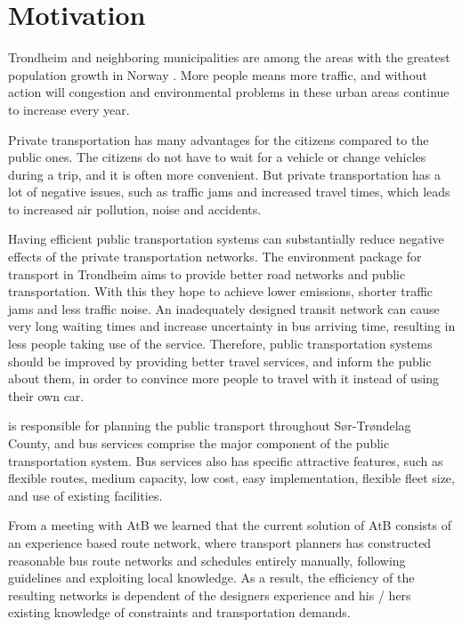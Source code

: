 \section{Motivation} 

Trondheim and neighboring municipalities are among the areas with the greatest population growth in Norway \citep{website:miljopakken}. More people means more traffic, and without action will congestion and environmental problems in these urban areas continue to increase every year. 

Private transportation has many advantages for the citizens compared to the public ones. The citizens do not have to wait for a vehicle or change vehicles during a trip, and it is often more convenient. But private transportation has a lot of negative issues, such as traffic jams and increased travel times, which leads to increased air pollution, noise and accidents. 

Having efficient public transportation systems can substantially reduce negative effects of the private transportation networks. The environment package \citep{website:miljopakken} for transport in Trondheim aims to provide better road networks and public transportation. With this they hope to achieve lower emissions, shorter traffic jams and less traffic noise. An inadequately designed transit network can cause very long waiting times and increase uncertainty in bus arriving time, resulting in less people taking use of the service. Therefore, public transportation systems should be improved by providing better travel services, and inform the public about them, in order to convince more people to travel with it instead of using their own car. 

\citet{website:atb} is responsible for planning the public transport throughout Sør-Trøndelag County, and bus services comprise the major component of the public transportation system. Bus services also has specific attractive features, such as flexible routes, medium capacity, low cost, easy implementation, flexible fleet size, and use of existing facilities. %

From a meeting with AtB we learned that the current solution of AtB consists of an experience based route network, where transport planners has constructed reasonable bus route networks and schedules entirely manually, following guidelines and exploiting local knowledge. As a result, the efficiency of the resulting networks is dependent of the designers experience and his / hers existing knowledge of constraints and transportation demands. 

